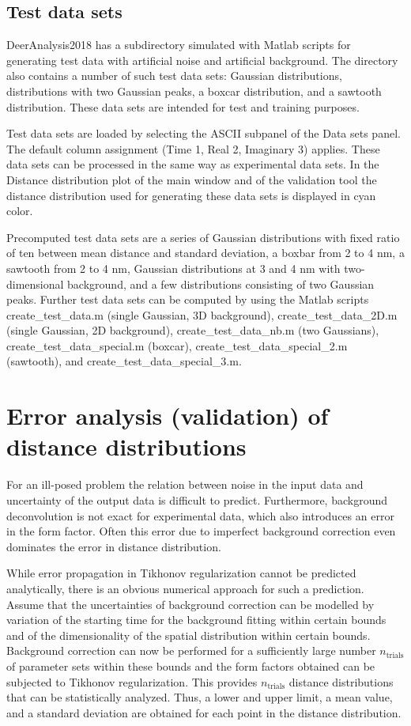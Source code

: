 \documentclass{article}
\begin{document}
\subsection{Test data sets}
DeerAnalysis2018 has a subdirectory {\ttfamily simulated} with Matlab scripts for generating test data with artificial noise and artificial background. The directory also contains a number of such test data sets: Gaussian distributions, distributions with two Gaussian peaks, a boxcar distribution, and a sawtooth distribution. These data sets are intended for test and training purposes.

Test data sets are loaded by selecting the {\ttfamily ASCII} subpanel of the {\ttfamily Data sets} panel. The default column assignment (Time 1, Real 2, Imaginary 3) applies. These data sets can be processed in the same way as experimental data sets. In the {\ttfamily Distance distribution} plot of the main window and of the validation tool the distance distribution used for generating these data sets is displayed in cyan color.

Precomputed test data sets are a series of Gaussian distributions with fixed ratio of ten between mean distance and standard deviation, a boxbar from 2 to 4 nm, a sawtooth from 2 to 4 nm, Gaussian distributions at 3 and 4 nm with two-dimensional background, and a few distributions consisting of two Gaussian peaks. Further test data sets can be computed by using the Matlab scripts {\ttfamily create\_test\_data.m} (single Gaussian, 3D background), {\ttfamily create\_test\_data\_2D.m} (single Gaussian, 2D background), {\ttfamily create\_test\_data\_nb.m} (two Gaussians), {\ttfamily create\_test\_data\_special.m} (boxcar), {\ttfamily create\_test\_data\_special\_2.m} (sawtooth), and {\ttfamily create\_test\_data\_special\_3.m}.

\section{Error analysis (validation) of distance distributions}
\label{validation}
For an ill-posed problem the relation between noise in the input data and uncertainty of the output data is difficult to predict. Furthermore, background deconvolution is not exact for experimental data, which also introduces an error in the form factor. Often this error due to imperfect background correction even dominates the error in distance distribution.

While error propagation in Tikhonov regularization cannot be predicted analytically, there is an obvious numerical approach for such a prediction. Assume that the uncertainties of background correction can be modelled by variation of the starting time for the background fitting within certain bounds and of the dimensionality of the spatial distribution within certain bounds. Background correction can now be performed for a sufficiently large number $n_\mathrm{trials}$ of parameter sets within these bounds and the form factors obtained can be subjected to Tikhonov regularization. This provides $n_\mathrm{trials}$ distance distributions that can be statistically analyzed. Thus, a lower and upper limit, a mean value, and a standard deviation are obtained for each point in the distance distribution.
\end{document}
